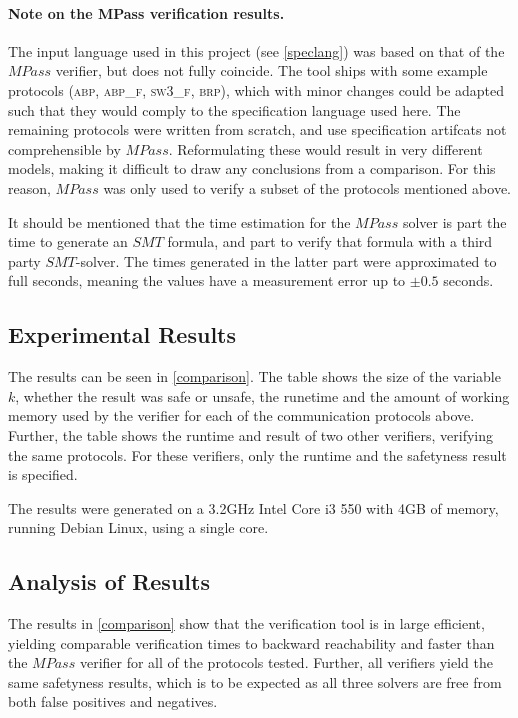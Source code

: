 \paragraph{Note on the MPass verification results.}
The input language used in this project (see \ref{speclang}) was based on that of the $MPass$ verifier, but does not fully coincide. The tool ships with some example protocols (\textsc{abp, abp\_f, sw3\_f, brp}), which with minor changes could be adapted such that they would comply to the specification language used here. The remaining protocols were written from scratch, and use specification artifcats not comprehensible by $MPass$. Reformulating these would result in very different models, making it difficult to draw any conclusions from a comparison. For this reason, $MPass$ was only used to verify a subset of the protocols mentioned above.

It should be mentioned that the time estimation for the $MPass$ solver is part the time to generate an $SMT$ formula, and part to verify that formula with a third party $SMT$-solver. The times generated in the latter part were approximated to full seconds, meaning the values have a measurement error up to $\pm 0.5$ seconds.

\subsection{Experimental Results}
The results can be seen in \ref{comparison}. The table shows the size of the variable $k$, whether the result was safe or unsafe, the runetime and the amount of working memory used by the verifier for each of the communication protocols above. Further, the table shows the runtime and result of two other verifiers, verifying the same protocols. For these verifiers, only the runtime and the safetyness result is specified.

The results were generated on a 3.2GHz Intel Core i3 550 with 4GB of memory, running Debian Linux, using a single core.

\subsection{Analysis of Results}
The results in \ref{comparison} show that the verification tool is in large efficient, yielding comparable verification times to backward reachability and faster than the $MPass$ verifier for all of the protocols tested. Further, all verifiers yield the same safetyness results, which is to be expected as all three solvers are free from both false positives and negatives.

